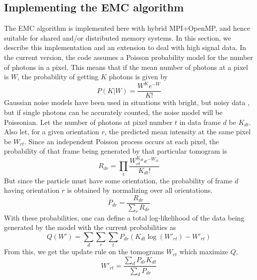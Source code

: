 \documentclass[]{iucr}              %
\begin{document}
\subsection{Implementing the EMC algorithm}\label{subsec:EMC}
The EMC algorithm \cite{loh2009} is implemented here with hybrid MPI+OpenMP, and hence suitable for shared and/or distributed memory systems. In this section, we describe this implementation and an extension to deal with high signal data. In the current version, the code assumes a Poisson probability model for the number of photons in a pixel. This means that if the mean number of photons at a pixel is $W$, the probability of getting $K$ photons is given by
\begin{equation}
P(K{\big\vert}W) = \frac{W^K e^{-W}}{K!}
\end{equation}
Gaussian noise models have been used in situations with bright, but noisy data \cite{loh2010,ekeberg2015}, but if single photons can be accurately counted, the noise model will be Poissonian. Let the number of photons at pixel number $t$ in data frame $d$ be $K_{dt}$. Also let, for a given orientation $r$, the predicted mean intensity at the same pixel be $W_{rt}$. Since an independent Poisson process occurs at each pixel, the probability of that frame being generated by that particular tomogram is
\begin{equation}
R_{dr} = \prod_t \frac{W_{rt}^{K_{dt}} e^{-W_{rt}}}{K_{dt}!}
\label{eqn:probnumr}
\end{equation}
But since the particle must have some orientation, the probability of frame $d$ having orientation $r$ is obtained by normalizing over all orientations.
\begin{equation}
P_{dr} = \frac{R_{dr}}{\sum\limits_r R_{dr}}
\label{eqn:prob}
\end{equation}
With these probabilities, one can define a total log-likelihood of the data being generated by the model with the current probabilities as
\begin{equation}
Q(W') = \sum_d \sum_r \sum_t P_{dr} (K_{dt} \log(W'_{rt}) - W'_{rt})
\label{eqn:totalq}
\end{equation}
From this, we get the update rule on the tomograms $W_{rt}$ which maximize $Q$,
\begin{equation}
W'_{rt} = \frac{\sum\limits_d P_{dr} K_{dt}}{\sum\limits_d P_{dr}}
\label{eqn:wupdate}
\end{equation}
\end{document}
